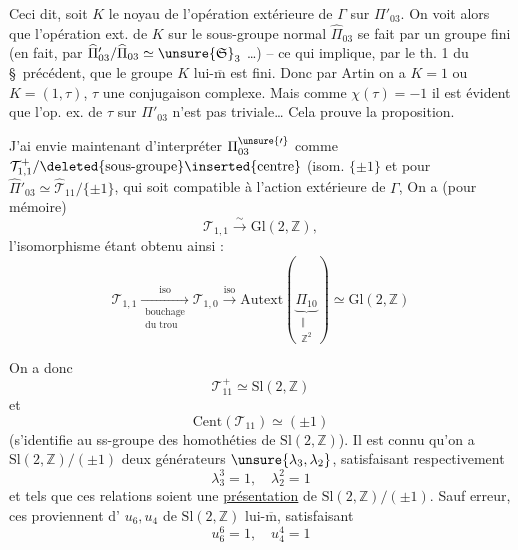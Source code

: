 
Ceci dit, soit $K$ le noyau de l'opération extérieure de $\Gamma$ sur $\Pi'_{03}$. On voit alors que  l'opération ext. de $K$ sur le sous-groupe normal $\widehat{\Pi}_{03}$ se fait par un groupe fini (en fait, par  $\widehat{\Pi}'_{03}/\widehat{\Pi}_{03}\simeq\unsure{\mathfrak S}_3$ \ldots) -- ce qui implique, par le th. 1 du \S\ précédent, que le groupe $K$ lui-$\overline{\mathrm m}$ est fini. Donc par Artin on a $K=1$ ou $K=(1,\tau)$, $\tau$ une conjugaison complexe. Mais comme $\chi(\tau)=-1$ il est évident que l'op. ex. de $\tau$ sur $\Pi'_{03}$  n'est pas triviale\ldots
{}
 Cela prouve la proposition.


J'ai envie maintenant d'interpréter $\Pi_{03}^{\unsure{\prime}}$ comme $\mathcal T^+_{1,1}/\deleted{\text{sous-groupe}}\inserted{\text{centre}}$ (isom.  $\{\pm1\}$\unsure{),|,} et  pour $\widehat{\Pi}'_{03}\simeq\widehat{\mathcal T}_{11}/\{\pm1\}$,  qui soit compatible à l'action extérieure de $\Gamma$, On a (pour mémoire)
\[
\tag{10}
\mathcal T_{1,1}\xrightarrow{\sim}\mathrm{Gl}(2,\mathbb Z),
\]
l'isomorphisme étant obtenu ainsi :
\[
\tag{11}
\mathcal T_{1,1}\xrightarrow[\substack{\text{bouchage}\\\text{du trou}}]{\mathrm{iso}}\mathcal T_{1,0}\xrightarrow{\mathrm{iso}}\mathrm{Autext}\left(\underbrace{\Pi_{10}}_{\substack{\Vert\\\mathbb Z^2}}\right)\simeq\mathrm{Gl}(2,\mathbb Z)
\]

On a donc
\[
\tag{12}
\mathcal T^+_{11}\simeq\mathrm{Sl}(2,\mathbb Z)
\]
et
\[
\tag{13}
\mathrm{Cent}(\mathcal T_{11})\simeq(\pm1)
\]
(s'identifie au ss-groupe des homothéties de $\mathrm{Sl}(2,\mathbb Z)$). Il est connu qu'on a  $\mathrm{Sl}(2,\mathbb Z)/(\pm1)$ deux générateurs $\unsure{\lambda_3,\lambda_2}$, satisfaisant respectivement
\[
\tag{14}
\lambda_3^3=1,\quad\lambda_2^2=1
\]
et tels que ces relations soient une \uline{présentation} de $\mathrm{Sl}(2,\mathbb Z)/(\pm1)$. Sauf erreur, ces  proviennent d' $u_6,u_4$ de $\mathrm{Sl}(2,\mathbb Z)$ lui-$\overline{\mathrm m}$, satisfaisant
\[
\tag{15}
u_6^6=1,\quad u_4^4=1
\]


